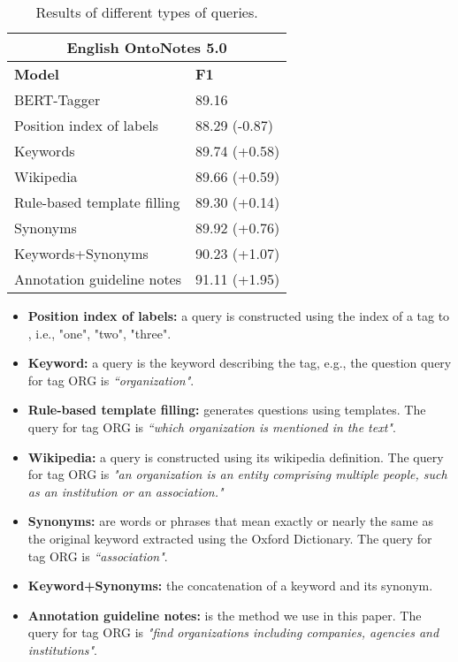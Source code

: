 \documentclass[11pt,a4paper]{article}
\newenvironment{tightitemize}{\begin{itemize}[topsep=0pt, partopsep=0pt] \setlength{\itemsep}{0pt}\setlength{\parskip}{0pt}}{\end{itemize}}
\begin{document}
\begin{table}
\small
\center
\begin{tabular}{ll}\toprule
\multicolumn{2}{c}{{\bf English OntoNotes 5.0}}\\\midrule
{\bf Model} &  {\bf F1} \\\midrule
BERT-Tagger & 89.16 \\\hline
{Position index of labels}  & 88.29 (-0.87) \\
{Keywords} &  89.74 (+0.58) \\
{Wikipedia} & 89.66 (+0.59)\\
{Rule-based template filling} & 89.30 (+0.14) \\
{Synonyms} &  89.92 (+0.76)\\
{Keywords+Synonyms}  &  90.23 (+1.07)\\
{Annotation guideline notes} & 91.11 (+1.95) \\\bottomrule
\end{tabular}
\caption{Results of different types of queries.}
\label{ablation-query-1}
\vskip -0.15in
\end{table}


\begin{tightitemize}
\item {\bf Position index of labels:} a query is constructed 
using the index of a tag to  
, i.e., "one", "two", "three".
\item {\bf Keyword:} a query is the keyword describing the tag, e.g., 
the question query for tag ORG is 
{\em ``organization"}.   
\item {\bf Rule-based template filling:} 
 generates 
  questions using templates. The query 
for tag ORG is
{\em ``which organization is mentioned in the text"}.   
\item {\bf Wikipedia:} a query is constructed using its  wikipedia definition. The query 
for tag ORG is
{\em "an organization is an entity comprising multiple people, such as an institution or an association."}


\item {\bf Synonyms:} are words or phrases that mean exactly or nearly the same as the original keyword extracted using
the Oxford Dictionary. The query 
for tag ORG is
{\em ``association"}.   


\item {\bf Keyword+Synonyms:} the concatenation of a keyword and its synonym.


\item {\bf Annotation guideline notes:} is the method we use in this paper. The query 
for tag ORG is {\em "find organizations including companies, agencies and institutions"}.


\end{tightitemize}
\end{document}
